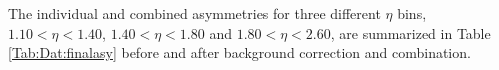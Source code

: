 The individual and combined asymmetries for three different $\eta$ bins, $1.10 < \eta < 1.40$, $1.40 < \eta < 1.80$ and
 $1.80 < \eta < 2.60$, are summarized in Table \ref{Tab:Dat:finalasy} before and after background correction and combination. %



